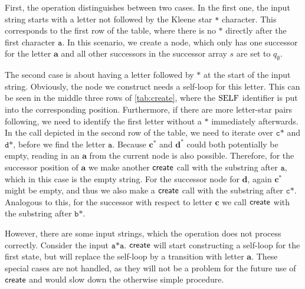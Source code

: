 First, the operation distinguishes between two cases. 
In the first one, the input string starts with a letter not followed by the Kleene star \texttt{*} character. This corresponds to the first row of the table, where there is no $\texttt{*}$ directly after the first character $\texttt{a}$. In this scenario, we create a node, which only has one successor for the letter $\bm{a}$ and all other successors in the successor array $s$ are set to $q_{\emptyset}$.

The second case is about having a letter followed by $\texttt{*}$ at the start of the input string. Obviously, the node we construct needs a self-loop for this letter. This can be seen in the middle three rows of \autoref{tab:create}, where the $\mathrm{SELF}$ identifier is put into the corresponding position. 
Furthermore, if there are more letter-star pairs following, we need to identify the first letter without a $\texttt{*}$ immediately afterwards. In the call depicted in the second row of the table, we need to iterate over $\texttt{c*}$ and $\texttt{d*}$, before we find the letter $\texttt{a}$. Because $\bm{c^{*}}$ and $\bm{d^{*}}$ could both potentially be empty, reading in an $\bm{a}$ from the current node is also possible. Therefore, for the successor position of $\bm{a}$ we make another $\operatorname{\textsf{create}}$ call with the substring after $\texttt{a}$, which in this case is the empty string.
For the successor node for $\bm{d}$, again $\bm{c^{*}}$ might be empty, and thus we also make a 
$\operatorname{\textsf{create}}$ call with the substring after $\texttt{c*}$. Analogous to this, for the successor with respect to letter $\bm{c}$ we call $\operatorname{\textsf{create}}$ with the substring after $\texttt{b*}$. 

However, there are some input strings, which the operation does not process correctly. Consider the input $\texttt{a*a}$. $\operatorname{\textsf{create}}$ will start constructing a self-loop for the first state, but will replace the self-loop by a transition with letter $\bm{a}$. 
These special cases are not handled, as they will not be a problem for the future use of $\operatorname{\textsf{create}}$ and would slow down the otherwise simple procedure. 

